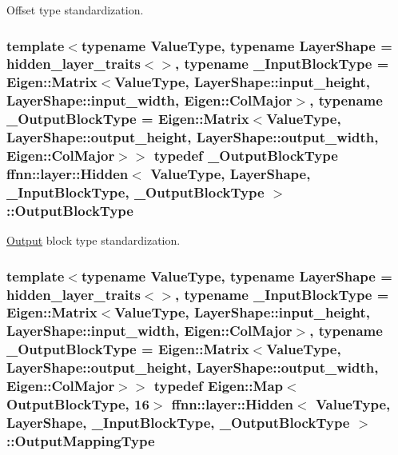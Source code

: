 Offset type standardization. 

\hypertarget{classffnn_1_1layer_1_1_hidden_a9b9e276188ef490ea5301f553225c735}{
\subsubsection[{Output\-Block\-Type}]{\setlength{\rightskip}{0pt plus 5cm}template$<$typename Value\-Type, typename Layer\-Shape = hidden\-\_\-layer\-\_\-traits$<$$>$, typename \-\_\-\-Input\-Block\-Type = Eigen\-::\-Matrix$<$\-Value\-Type, Layer\-Shape\-::input\-\_\-height,  Layer\-Shape\-::input\-\_\-width,  Eigen\-::\-Col\-Major$>$, typename \-\_\-\-Output\-Block\-Type = Eigen\-::\-Matrix$<$\-Value\-Type, Layer\-Shape\-::output\-\_\-height, Layer\-Shape\-::output\-\_\-width, Eigen\-::\-Col\-Major$>$$>$ typedef \-\_\-\-Output\-Block\-Type {\bf ffnn\-::layer\-::\-Hidden}$<$ Value\-Type, Layer\-Shape, \-\_\-\-Input\-Block\-Type, \-\_\-\-Output\-Block\-Type $>$\-::{\bf Output\-Block\-Type}}}\label{classffnn_1_1layer_1_1_hidden_a9b9e276188ef490ea5301f553225c735}


\hyperlink{classffnn_1_1layer_1_1_output}{Output} block type standardization. 

\hypertarget{classffnn_1_1layer_1_1_hidden_a619ae9b0890cb86b66ac2b591b5a5610}{
\subsubsection[{Output\-Mapping\-Type}]{\setlength{\rightskip}{0pt plus 5cm}template$<$typename Value\-Type, typename Layer\-Shape = hidden\-\_\-layer\-\_\-traits$<$$>$, typename \-\_\-\-Input\-Block\-Type = Eigen\-::\-Matrix$<$\-Value\-Type, Layer\-Shape\-::input\-\_\-height,  Layer\-Shape\-::input\-\_\-width,  Eigen\-::\-Col\-Major$>$, typename \-\_\-\-Output\-Block\-Type = Eigen\-::\-Matrix$<$\-Value\-Type, Layer\-Shape\-::output\-\_\-height, Layer\-Shape\-::output\-\_\-width, Eigen\-::\-Col\-Major$>$$>$ typedef Eigen\-::\-Map$<${\bf Output\-Block\-Type}, 16$>$ {\bf ffnn\-::layer\-::\-Hidden}$<$ Value\-Type, Layer\-Shape, \-\_\-\-Input\-Block\-Type, \-\_\-\-Output\-Block\-Type $>$\-::{\bf Output\-Mapping\-Type}}}\label{classffnn_1_1layer_1_1_hidden_a619ae9b0890cb86b66ac2b591b5a5610}


